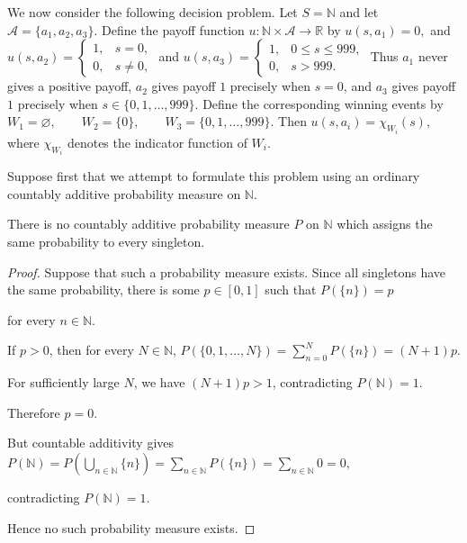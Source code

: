 \documentclass[10pt,a4paper]{book}
\begin{document}
We now consider the following decision problem. Let $
    S=\mathbb N
$ and let $
    \mathcal A=\{a_1,a_2,a_3\}.
$ Define the payoff function $
    u:\mathbb N\times\mathcal A\longrightarrow\mathbb R
$
by $
    u(s,a_1)=0,
$ and $
    u(s,a_2)
    =
    \begin{cases}
        1, & s=0,    \\
        0, & s\neq0,
    \end{cases}
$ and $
    u(s,a_3)
    =
    \begin{cases}
        1, & 0\leq s\leq999, \\
        0, & s>999.
    \end{cases}
$
Thus $a_1$ never gives a positive payoff, $a_2$ gives payoff $1$ precisely when $s=0$, and $a_3$ gives payoff $1$ precisely when
$
    s\in\{0,1,\ldots,999\}.
$
Define the corresponding winning events by
$
    W_1=\varnothing,
    \qquad
    W_2=\{0\},
    \qquad
    W_3=\{0,1,\ldots,999\}.
$
Then
$
    u(s,a_i)=\chi_{W_i}(s),
$
where $\chi_{W_i}$ denotes the indicator function of $W_i$.

Suppose first that we attempt to formulate this problem using an ordinary countably additive probability measure on $\mathbb N$.


There is no countably additive probability measure $P$ on $\mathbb N$ which assigns the same probability to every singleton.



\begin{proof}

    Suppose that such a probability measure exists. Since all singletons have the same probability, there is some $p\in[0,1]$ such that
    $
        P(\{n\})=p
    $

    for every $n\in\mathbb N$.

    If $p>0$, then for every $N\in\mathbb N$,
    $
        P(\{0,1,\ldots,N\})
        =
        \sum_{n=0}^{N}P(\{n\})
        =
        (N+1)p.
    $

    For sufficiently large $N$, we have $(N+1)p>1$, contradicting
    $
        P(\mathbb N)=1.
    $

    Therefore
    $
        p=0.
    $

    But countable additivity gives
    $
        P(\mathbb N)
        =
        P\left(\bigcup_{n\in\mathbb N}\{n\}\right)
        =
        \sum_{n\in\mathbb N}P(\{n\})
        =
        \sum_{n\in\mathbb N}0
        =
        0,
    $

    contradicting
    $
        P(\mathbb N)=1.
    $

    Hence no such probability measure exists.
\end{proof}
\end{document}
